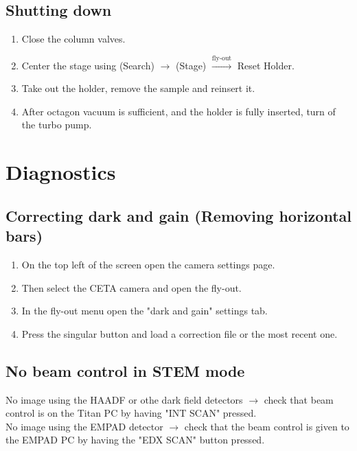 \documentclass[a4paper]{scrartcl}
\begin{document}
\subsection*{Shutting down}
\begin{enumerate}
    \item Close the column valves.
    \item Center the stage using (Search) $\rightarrow$ (Stage) $\xrightarrow{\text{fly-out}}$ Reset Holder.
    \item Take out the holder, remove the sample and reinsert it.
    \item After octagon vacuum is sufficient, and the holder is fully inserted, turn of the turbo pump.
\end{enumerate}

\section*{Diagnostics}
\subsection*{Correcting dark and gain (Removing horizontal bars)}
\begin{enumerate}
    \item On the top left of the screen open the camera settings page.
    \item Then select the CETA camera and open the fly-out.
    \item In the fly-out menu open the "dark and gain" settings tab.
    \item Press the singular button and load a correction file or the most recent one.    
\end{enumerate}

\subsection*{No beam control in STEM mode}
No image using the HAADF or othe dark field detectors $\rightarrow$ check that beam control is on the Titan PC by having "INT SCAN" pressed.\\
No image using the EMPAD detector $\rightarrow$ check that the beam control is given to the EMPAD PC by having the "EDX SCAN" button pressed.\\
\end{document}
